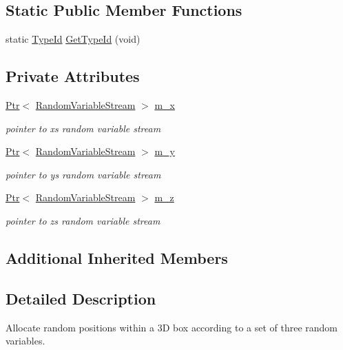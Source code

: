 \subsection*{Static Public Member Functions}
\begin{DoxyCompactItemize}
\item 
static \hyperlink{classns3_1_1TypeId}{Type\+Id} \hyperlink{classns3_1_1RandomBoxPositionAllocator_a7a4c41fc95d539e41938fbf749852326}{Get\+Type\+Id} (void)
\end{DoxyCompactItemize}
\subsection*{Private Attributes}
\begin{DoxyCompactItemize}
\item 
\hyperlink{classns3_1_1Ptr}{Ptr}$<$ \hyperlink{classns3_1_1RandomVariableStream}{Random\+Variable\+Stream} $>$ \hyperlink{classns3_1_1RandomBoxPositionAllocator_a1675033587eb56a97312c9e3329564f4}{m\+\_\+x}
\begin{DoxyCompactList}\small\item\em pointer to x\textquotesingle{}s random variable stream \end{DoxyCompactList}\item 
\hyperlink{classns3_1_1Ptr}{Ptr}$<$ \hyperlink{classns3_1_1RandomVariableStream}{Random\+Variable\+Stream} $>$ \hyperlink{classns3_1_1RandomBoxPositionAllocator_a2b3aaf0c1950991dba4fc1716d7690cd}{m\+\_\+y}
\begin{DoxyCompactList}\small\item\em pointer to y\textquotesingle{}s random variable stream \end{DoxyCompactList}\item 
\hyperlink{classns3_1_1Ptr}{Ptr}$<$ \hyperlink{classns3_1_1RandomVariableStream}{Random\+Variable\+Stream} $>$ \hyperlink{classns3_1_1RandomBoxPositionAllocator_af99b35deb9b0bb4b85dd07495377b5be}{m\+\_\+z}
\begin{DoxyCompactList}\small\item\em pointer to z\textquotesingle{}s random variable stream \end{DoxyCompactList}\end{DoxyCompactItemize}
\subsection*{Additional Inherited Members}


\subsection{Detailed Description}
Allocate random positions within a 3D box according to a set of three random variables. 

